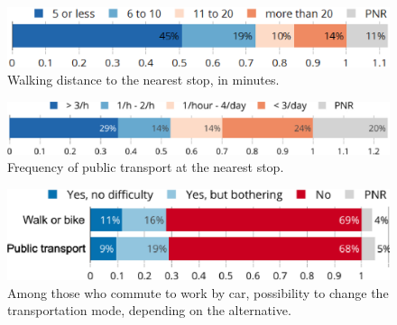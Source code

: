 \documentclass[english,5p,authoryear]{elsarticle}
\begin{document}



\begin{figure}[t]
\centering
\includegraphics[width=\columnwidth]{Images_EPS/transports_distance_trim.eps}
\caption{Walking distance to the nearest stop, in minutes.}
\label{fig:transports_distance}
\end{figure}

\begin{figure}[t]
\centering
\includegraphics[width=\columnwidth]{Images_EPS/transports_frequency_trim.eps}
\caption{Frequency of public transport at the nearest stop.}
\label{fig:transports_frequency}
\end{figure}

\begin{figure}[b]
\centering
\includegraphics[width=\columnwidth]{Images_EPS/transports_work.eps}
\caption{Among those who commute to work by car, possibility to change the transportation mode, depending on the alternative.}
\label{fig:transports_work}
\end{figure}
    
\end{document}
